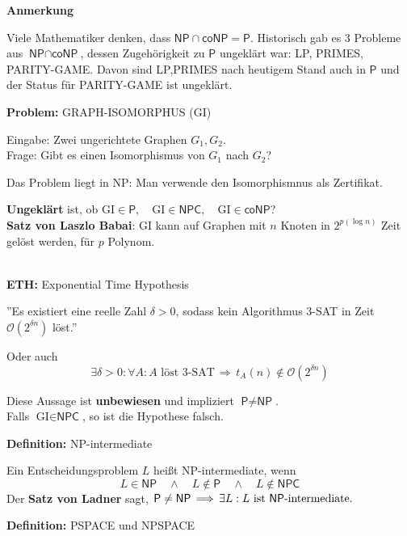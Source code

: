 \documentclass[a4paper,graphics,11pt]{article}
\begin{document}
\newpage

\textbf{Anmerkung}

Viele Mathematiker denken, dass $\textsf{NP} \cap \textsf{coNP} = \textsf{P}$. Historisch gab es 3 Probleme
aus $\textsf{NP} \cap\textsf{coNP}$, dessen Zugehörigkeit zu $\textsf{P}$ ungeklärt war: LP, PRIMES, PARITY-GAME. Davon sind LP,PRIMES nach heutigem Stand auch in $\textsf{P}$ und der Status für PARITY-GAME ist ungeklärt.

\strut

\textbf{Problem:} GRAPH-ISOMORPHUS (GI)

Eingabe: Zwei ungerichtete Graphen $G_1, G_2$.
\\[5pt]
Frage: Gibt es einen Isomorphismus von $G_1$ nach $G_2$?

Das Problem liegt in \textsf{NP}: Man verwende den Isomorphismnus als Zertifikat.

\textbf{Ungeklärt} ist, ob $\text{GI} \in \textsf{P},\quad \text{GI} \in \textsf{NPC},\quad \text{GI} \in \textsf{coNP}$?
\\[20pt]
\textbf{Satz von Laszlo Babai}: GI kann auf Graphen mit $n$ Knoten in $2^{p(\log n)}$ Zeit gelöst werden,
für $p$ Polynom.

\strut\\

\textbf{ETH:} Exponential Time Hypothesis

''Es existiert eine reelle Zahl $\delta > 0$,
sodass kein Algorithmus 3-SAT in Zeit $\mathcal{O}(2^{\delta n})$ löst.''

Oder auch
$$
    \exists \delta > 0 : \forall A: \text{$A$ löst 3-SAT} \,\Longrightarrow\, t_A(n) \notin \mathcal{O}(2^{\delta n})
$$

Diese Aussage ist \textbf{unbewiesen} und impliziert $\textsf{P} \neq \textsf{NP}$.\\
Falls $\text{GI} \in \textsf{NPC}$, so ist die Hypothese falsch.

\strut

\textbf{Definition:} \textsf{NP}-intermediate

Ein Entscheidungsproblem $L$ heißt \textsf{NP}-intermediate, wenn
$$
    L \in \textsf{NP} \quad \land \quad L \notin \textsf{P} \quad \land \quad L \notin \textsf{NPC}
$$
Der \textbf{Satz von Ladner} sagt,
$\textsf{P} \neq \textsf{NP} \,\Longrightarrow\, \exists L: L \text{ ist \textsf{NP}-intermediate.}$

\strut

\textbf{Definition:} \textsf{PSPACE} und \textsf{NPSPACE}
\end{document}
